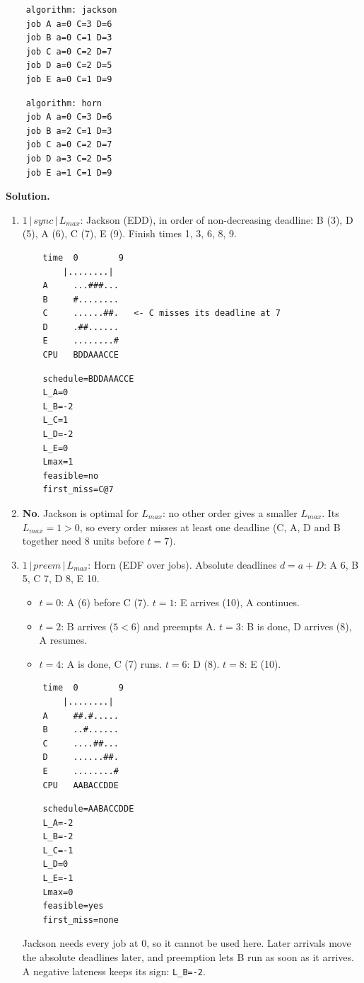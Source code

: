 \begin{lstlisting}
    algorithm: jackson
    job A a=0 C=3 D=6
    job B a=0 C=1 D=3
    job C a=0 C=2 D=7
    job D a=0 C=2 D=5
    job E a=0 C=1 D=9
\end{lstlisting}

\begin{lstlisting}
    algorithm: horn
    job A a=0 C=3 D=6
    job B a=2 C=1 D=3
    job C a=0 C=2 D=7
    job D a=3 C=2 D=5
    job E a=1 C=1 D=9
\end{lstlisting}

\textbf{Solution.}
\begin{enumerate}
    \item $1 \,|\, \textit{sync} \,|\, L_{max}$: Jackson (EDD), in order of non-decreasing deadline: B (3), D (5), A (6), C (7), E (9). Finish times 1, 3, 6, 8, 9.
\begin{verbatim}
    time  0        9
        |........|
    A     ...###...
    B     #........
    C     ......##.   <- C misses its deadline at 7
    D     .##......
    E     ........#
    CPU   BDDAAACCE
\end{verbatim}

\begin{verbatim}
    schedule=BDDAAACCE
    L_A=0
    L_B=-2
    L_C=1
    L_D=-2
    L_E=0
    Lmax=1
    feasible=no
    first_miss=C@7
\end{verbatim}
    \item \textbf{No}. Jackson is optimal for $L_{max}$: no other order gives a smaller $L_{max}$. Its $L_{max} = 1 > 0$, so every order misses at least one deadline (C, A, D and B together need 8 units before $t = 7$).
    \item $1 \,|\, \textit{preem} \,|\, L_{max}$: Horn (EDF over jobs). Absolute deadlines $d = a + D$: A 6, B 5, C 7, D 8, E 10.
    \begin{itemize}
        \item $t = 0$: A (6) before C (7). $t = 1$: E arrives (10), A continues.
        \item $t = 2$: B arrives ($5 < 6$) and preempts A. $t = 3$: B is done, D arrives (8), A resumes.
        \item $t = 4$: A is done, C (7) runs. $t = 6$: D (8). $t = 8$: E (10).
    \end{itemize}

\begin{verbatim}
    time  0        9
        |........|
    A     ##.#.....
    B     ..#......
    C     ....##...
    D     ......##.
    E     ........#
    CPU   AABACCDDE
\end{verbatim}

\begin{verbatim}
    schedule=AABACCDDE
    L_A=-2
    L_B=-2
    L_C=-1
    L_D=0
    L_E=-1
    Lmax=0
    feasible=yes
    first_miss=none
\end{verbatim}
    Jackson needs every job at 0, so it cannot be used here. Later arrivals move the absolute deadlines later, and preemption lets B run as soon as it arrives. A negative lateness keeps its sign: \texttt{L\_B=-2}.
\end{enumerate}

